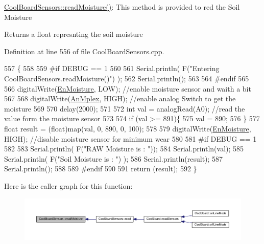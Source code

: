 \hyperlink{class_cool_board_sensors_a8761bff50373c485f4465c8db47d0633}{Cool\+Board\+Sensors\+::read\+Moisture()}\+: This method is provided to red the Soil Moisture

\begin{DoxyReturn}{Returns}
a float represnting the soil moisture 
\end{DoxyReturn}


Definition at line 556 of file Cool\+Board\+Sensors.\+cpp.


\begin{DoxyCode}
557 \{
558 
559 \textcolor{preprocessor}{#if DEBUG == 1}
560     
561     Serial.println( F(\textcolor{stringliteral}{"Entering CoolBoardSensors.readMoisture()"}) );
562     Serial.println();
563     
564 \textcolor{preprocessor}{#endif}
565 
566     digitalWrite(\hyperlink{class_cool_board_sensors_a6177d02e14a057a2f171a2e930b5038d}{EnMoisture}, LOW);                 \textcolor{comment}{//enable moisture sensor and waith a bit}
567 
568     digitalWrite(\hyperlink{class_cool_board_sensors_a12ef28b1046219e0aee10bf64e28c4a5}{AnMplex}, HIGH);         \textcolor{comment}{//enable analog Switch to get the moisture}
569 
570     delay(2000);
571 
572     \textcolor{keywordtype}{int} val = analogRead(A0);                       \textcolor{comment}{//read the value form the moisture sensor}
573 
574     \textcolor{keywordflow}{if} (val >= 891)\{
575         val = 890;
576     \}
577     \textcolor{keywordtype}{float} result = (float)map(val, 0, 890, 0, 100); 
578 
579     digitalWrite(\hyperlink{class_cool_board_sensors_a6177d02e14a057a2f171a2e930b5038d}{EnMoisture}, HIGH);                  \textcolor{comment}{//disable moisture sensor for minimum wear}
580     
581 \textcolor{preprocessor}{#if DEBUG == 1 }
582 
583     Serial.println( F(\textcolor{stringliteral}{"RAW Moisture  is : "}));
584     Serial.println(val);
585     Serial.println( F(\textcolor{stringliteral}{"Soil Moisture is : "}) );
586     Serial.println(result);
587     Serial.println();
588 
589 \textcolor{preprocessor}{#endif }
590 
591     \textcolor{keywordflow}{return} (result);
592 \}
\end{DoxyCode}
Here is the caller graph for this function\+:\nopagebreak
\begin{figure}[H]
\begin{center}
\leavevmode
\includegraphics[width=350pt]{de/d46/class_cool_board_sensors_a8761bff50373c485f4465c8db47d0633_icgraph}
\end{center}
\end{figure}
\mbox{\label{class_cool_board_sensors_a6944b6ea7bce8e2fce1b434acfd9d5f3}} 
